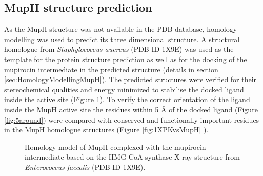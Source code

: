 	\subsection{MupH structure prediction}
	\label{sec:MupHstructure}
	As the MupH structure was not available in the PDB database, homology modelling was used to predict its three dimensional structure. A structural homologue from \textit{Staphylococcus auereus} (PDB ID 1X9E) was used as the template for the protein structure prediction as well as for the docking of the mupirocin intermediate in the predicted structure (details in section \ref{sec:HomologyModellingMupH}). The predicted structures were verified for their stereochemical qualities and energy minimized to stabilise the docked ligand inside the active site (Figure \ref{fig:MupH}). To verify the correct orientation of the ligand inside the MupH active site the residues within 5 \AA{} of the docked ligand (Figure \ref{fig:5around}) were compared with conserved and functionally important residues in the MupH homologue structures (Figure \ref{fig:1XPKvsMupH} ).
	
			\setlength\fboxsep{5pt}
			\setlength\fboxrule{1.5pt}
			\begin{figure}[]
			\centering
			\caption[Homology model of MupH complexed with the mupirocin intermediate.]{Homology model of MupH complexed with the mupirocin intermediate based on the HMG-CoA synthase X-ray structure from \textit{Enterococcus faecalis} (PDB ID 1X9E).}
			\label{fig:MupH}
			\end{figure}	

